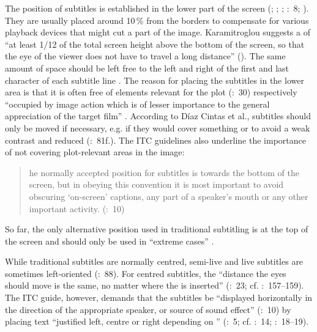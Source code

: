 The position of subtitles is established in the lower part of the screen (\citealt{Karamitroglou1998}; \citealt{Itc1999}; \citealt{Diaz_cintas2007b}; \citealt{Diaz_cintas2007}:~8; \citealt{Ford_williams2009}). They are usually placed around 10\,\% from the borders to compensate for various playback devices that might cut a part of the image. Karamitroglou suggests a  of “at least 1/12 of the total screen height above the bottom of the screen, so that the eye of the viewer does not have to travel a long distance” (\citeyear{Karamitroglou1998}). The same amount of space should be left free to the left and right of the first and last character of each subtitle line \citep{Karamitroglou1998}. The reason for placing the subtitles in the lower area is that it is often free of elements relevant for the plot (\citealt{Leisner2009}:~30) respectively “occupied by image action which is of lesser importance to the general  appreciation of the target film” \citep{Karamitroglou1998}. According to Díaz Cintas et al., subtitles should only be moved if necessary, e.g. if they would cover something or to avoid a weak contrast and reduced  (\citeyear{Diaz_cintas2007b}:~81f.). The ITC guidelines also underline the importance of not covering plot-relevant areas in the image:
\begin{quote}
he normally accepted position for subtitles is towards the bottom of the screen, but in obeying this convention it is most important to avoid obscuring ‘on-screen’ captions, any part of a speaker’s mouth or any other important activity. (\citealt{Itc1999}:~10)
\end{quote}
So far, the only alternative position used in traditional subtitling is at the top of the screen \citep{Karamitroglou1998} and should only be used in “extreme cases” \citep{Karamitroglou1998}.

While traditional subtitles are normally centred, semi-live and live subtitles are sometimes left-oriented (\citealt{Diaz_cintas2007b}:~88). For centred subtitles, the “distance the eyes should move is the same, no matter where the  is inserted” (\citealt{Gottlieb2012}:~23; cf. \citealt{Ivarsson1998}:~157--159). The ITC guide, however, demands that the subtitles be “displayed horizontally in the direction of the appropriate speaker, or source of sound effect” (\citeyear{Itc1999}:~10) by placing text “justified left, centre or right depending on ” (\citealt{Itc1999}:~5; cf. \citealt{Diaz_cintas2007}:~14; \citealt{Ford_williams2009}:~18--19).

